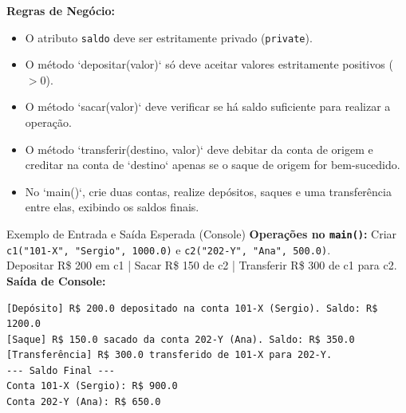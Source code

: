 \documentclass[12pt]{article}
\begin{document}
\vspace{0.2cm}
\begin{center}
\end{center}

\vspace{0.2cm}
\noindent
\textbf{Regras de Negócio:}
\begin{itemize}[leftmargin=1.5em]
  \item O atributo \texttt{saldo} deve ser estritamente privado (\texttt{private}).
  \item O método `depositar(valor)` só deve aceitar valores estritamente positivos ($>0$).
  \item O método `sacar(valor)` deve verificar se há saldo suficiente para realizar a operação.
  \item O método `transferir(destino, valor)` deve debitar da conta de origem e creditar na conta de `destino` apenas se o saque de origem for bem-sucedido.
  \item No `main()`, crie duas contas, realize depósitos, saques e uma transferência entre elas, exibindo os saldos finais.
\end{itemize}

\vspace{0.2cm}
\begin{block}{Exemplo de Entrada e Saída Esperada (Console)}
\textbf{Operações no \texttt{main()}:} 
Criar \texttt{c1("101-X", "Sergio", 1000.0)} e \texttt{c2("202-Y", "Ana", 500.0)}.\\
Depositar R\$ 200 em c1 | Sacar R\$ 150 de c2 | Transferir R\$ 300 de c1 para c2.\\
\textbf{Saída de Console:}
\begin{verbatim}
[Depósito] R$ 200.0 depositado na conta 101-X (Sergio). Saldo: R$ 1200.0
[Saque] R$ 150.0 sacado da conta 202-Y (Ana). Saldo: R$ 350.0
[Transferência] R$ 300.0 transferido de 101-X para 202-Y.
--- Saldo Final ---
Conta 101-X (Sergio): R$ 900.0
Conta 202-Y (Ana): R$ 650.0
\end{verbatim}
\end{block}
\end{document}
